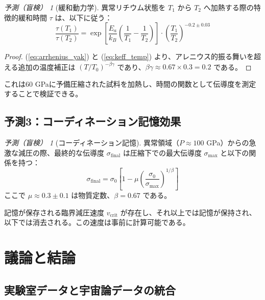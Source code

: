 \documentclass[11pt,a4paper]{article}
\theoremstyle{remark}
\newtheorem{prediction}[theorem]{予測（盲検）}
\begin{document}
	\begin{prediction}[緩和動力学]
		異常リチウム状態を \(T_1\) から \(T_2\) へ加熱する際の特徴的緩和時間 \(\tau\) は、以下に従う：
		\begin{equation}
			\frac{\tau(T_1)}{\tau(T_2)} = \exp\left[ \frac{E_a}{k_B} \left( \frac{1}{T_1} - \frac{1}{T_2} \right) \right] \cdot \left( \frac{T_1}{T_2} \right)^{-0.2 \pm 0.03}
			\label{eq:relaxation_prediction}
		\end{equation}
		\label{pred:relaxation}
	\end{prediction}
	
	\begin{proof}
		(\ref{eq:arrhenius_yak}) と (\ref{eq:keff_temp}) より、アレニウス的振る舞いを超える追加の温度補正は \((T/T_0)^{-\beta\gamma}\) であり、\(\beta\gamma \approx 0.67 \times 0.3 = 0.2\) である。
	\end{proof}
	
	これは60 GPaに予備圧縮された試料を加熱し、時間の関数として伝導度を測定することで検証できる。
	
	\subsection{予測3：コーディネーション記憶効果}
	
	\begin{prediction}[コーディネーション記憶]
		異常領域（\(P \approx 100\) GPa）からの急激な減圧の際、最終的な伝導度 \(\sigma_{\text{final}}\) は圧縮下での最大伝導度 \(\sigma_{\text{max}}\) と以下の関係を持つ：
		\begin{equation}
			\sigma_{\text{final}} = \sigma_0 \left[1 - \mu \left( \frac{\sigma_0}{\sigma_{\text{max}}} \right)^{1/\beta} \right]
			\label{eq:memory_prediction}
		\end{equation}
		ここで \(\mu \approx 0.3 \pm 0.1\) は物質定数、\(\beta = 0.67\) である。
		\label{pred:memory}
	\end{prediction}
	
	記憶が保存される臨界減圧速度 \(v_{\text{crit}}\) が存在し、それ以上では記憶が保持され、以下では消去される。この速度は事前に計算可能である。
	
	\section{議論と結論}
	
	\subsection{実験室データと宇宙論データの統合}
	
\end{document}
